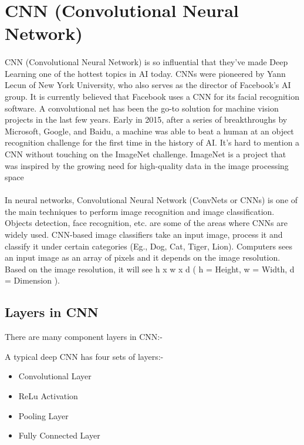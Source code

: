 \section{CNN (Convolutional Neural Network) }
\paragraph{}
CNN (Convolutional Neural Network) is so influential that they’ve made Deep Learning one of the hottest topics in AI today. CNNs were pioneered by Yann Lecun of New York University, who also serves as the director of Facebook's AI group. It is currently believed that Facebook uses a CNN for its facial recognition software. A convolutional net has been the go-to solution for machine vision projects in the last few years. Early in 2015, after a series of breakthroughs by Microsoft, Google, and Baidu, a machine was able to beat a human at an object recognition challenge for the first time in the history of AI. It’s hard to mention a CNN without touching on the ImageNet challenge. ImageNet is a project that was inspired by the growing need for high-quality data in the image processing space
\paragraph{}
In neural networks, Convolutional Neural Network (ConvNets or CNNs) is one of the main techniques to perform image recognition and image classification. Objects detection, face recognition, etc. are some of the areas where CNNs are widely used.
CNN-based image classifiers take an input image, process it and classify it under certain categories (Eg., Dog, Cat, Tiger, Lion). Computers sees an input image as an array of pixels and it depends on the image resolution. Based on the image resolution, it will see h x w x d ( h = Height, w = Width, d = Dimension ).
\subsection{Layers in CNN}
There are many component layers in CNN:-

A typical deep CNN has four sets of layers:-
\begin{itemize}
\item{Convolutional Layer}
\item{ReLu Activation}
\item{Pooling Layer}
\item{Fully Connected Layer}
\end{itemize}

